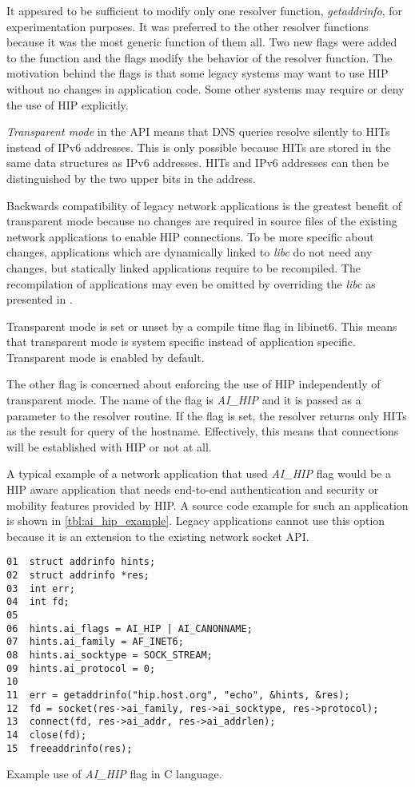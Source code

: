 It appeared to be sufficient to modify only one resolver function,
\textit{getaddrinfo}, for experimentation purposes. It was preferred
to the other resolver functions because it was the most generic
function of them all. Two new flags were added to the function and the
flags modify the behavior of the resolver function. The motivation
behind the flags is that some legacy systems may want to use HIP
without no changes in application code. Some other systems may require
or deny the use of HIP explicitly.

\textit{Transparent mode} in the API means that DNS queries resolve
silently to HITs instead of IPv6 addresses. This is only possible
because HITs are stored in the same data structures as IPv6
addresses. HITs and IPv6 addresses can then be distinguished by the
two upper bits in the address.

Backwards compatibility of legacy network applications is the greatest
benefit of transparent mode because no changes are required in source
files of the existing network applications to enable HIP
connections. To be more specific about changes, applications which are
dynamically linked to \textit{libc} do not need any changes, but
statically linked applications require to be recompiled. The
recompilation of applications may even be omitted by overriding the
\textit{libc} as presented in \cite{libcoverride}.

Transparent mode is set or unset by a compile time flag in
libinet6. This means that transparent mode is system specific instead
of application specific. Transparent mode is enabled by default.

The other flag is concerned about enforcing the use of HIP
independently of transparent mode. The name of the flag is
\textit{AI\_HIP} and it is passed as a parameter to the resolver
routine. If the flag is set, the resolver returns only HITs as the
result for query of the hostname. Effectively, this means that
connections will be established with HIP or not at all.

A typical example of a network application that used \textit{AI\_HIP}
flag would be a HIP aware application that needs end-to-end
authentication and security or mobility features provided by HIP. A
source code example for such an application is shown in
\autoref{tbl:ai_hip_example}. Legacy applications cannot use this
option because it is an extension to the existing network socket API.

\begin{table}[hbt]
\begin{verbatim}
01  struct addrinfo hints;
02  struct addrinfo *res;
03  int err;
04  int fd;
05
06  hints.ai_flags = AI_HIP | AI_CANONNAME;
07  hints.ai_family = AF_INET6;
08  hints.ai_socktype = SOCK_STREAM;
09  hints.ai_protocol = 0;
10
11  err = getaddrinfo("hip.host.org", "echo", &hints, &res);
12  fd = socket(res->ai_family, res->ai_socktype, res->protocol);
13  connect(fd, res->ai_addr, res->ai_addrlen);
14  close(fd);
15  freeaddrinfo(res);
\end{verbatim}
\caption{Example use of \textit{AI\_HIP} flag in C language.}
\label{tbl:ai_hip_example}
\end{table}

